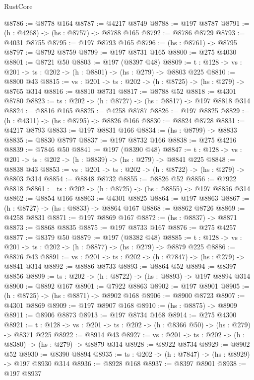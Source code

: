 \begin{lexlean}{RustCore}
\begin{coremodule}
@8786 := @8778 @164
@8787 := @4217 @8749
@8788 := @197 @8787
@8791 := (h : @4268) -> (hs : @8757) -> @8788 @165
@8792 := @8786 @8729
@8793 := @4031 @8755
@8795 := @197 @8793 @165
@8796 := (hs : @8761) -> @8795
@8797 := @8792 @8759
@8799 := @197 @8731 @165
@8800 := @275 @4030
@8801 := @8721 @50
@8803 := @197 (@8397 @48)
@8809 := {t : @128} -> {vs : @201} -> {ts : @202} -> (h : @8801) -> (hs : @279) -> @8803 @225
@8810 := @8800 @43
@8815 := {vs : @201} -> {ts : @202} -> (h : @8725) -> (hs : @279) -> @8765 @314
@8816 := @8810 @8731
@8817 := @8788 @52
@8818 := @4301 @8780
@8823 := {ts : @202} -> (h : @8727) -> (hs : @8817) -> @197 @8818 @314
@8824 := @8816 @165
@8825 := @4258 @8787
@8826 := @197 @8825
@8829 := (h : @4311) -> (hs : @8795) -> @8826 @166
@8830 := @8824 @8728
@8831 := @4217 @8793
@8833 := @197 @8831 @166
@8834 := (hs : @8799) -> @8833
@8835 := @8830 @8797
@8837 := @197 @8732 @166
@8838 := @275 @4216
@8839 := @7846 @50
@8841 := @197 (@8390 @48)
@8847 := {t : @128} -> {vs : @201} -> {ts : @202} -> (h : @8839) -> (hs : @279) -> @8841 @225
@8848 := @8838 @43
@8853 := {vs : @201} -> {ts : @202} -> (h : @8722) -> (hs : @279) -> @8803 @314
@8854 := @8848 @8732
@8855 := @8826 @52
@8856 := @7922 @8818
@8861 := {ts : @202} -> (h : @8725) -> (hs : @8855) -> @197 @8856 @314
@8862 := @8854 @166
@8863 := @4301 @8825
@8864 := @197 @8863
@8867 := (h : @8727) -> (hs : @8833) -> @8864 @167
@8868 := @8862 @8726
@8869 := @4258 @8831
@8871 := @197 @8869 @167
@8872 := (hs : @8837) -> @8871
@8873 := @8868 @8835
@8875 := @197 @8733 @167
@8876 := @275 @4257
@8877 := @8379 @50
@8879 := @197 (@8382 @48)
@8885 := {t : @128} -> {vs : @201} -> {ts : @202} -> (h : @8877) -> (hs : @279) -> @8879 @225
@8886 := @8876 @43
@8891 := {vs : @201} -> {ts : @202} -> (h : @7847) -> (hs : @279) -> @8841 @314
@8892 := @8886 @8733
@8893 := @8864 @52
@8894 := @8397 @8856
@8899 := {ts : @202} -> (h : @8722) -> (hs : @8893) -> @197 @8894 @314
@8900 := @8892 @167
@8901 := @7922 @8863
@8902 := @197 @8901
@8905 := (h : @8725) -> (hs : @8871) -> @8902 @168
@8906 := @8900 @8723
@8907 := @4301 @8869
@8909 := @197 @8907 @168
@8910 := (hs : @8875) -> @8909
@8911 := @8906 @8873
@8913 := @197 @8734 @168
@8914 := @275 @4300
@8921 := {t : @128} -> {vs : @201} -> {ts : @202} -> (h : @8366 @50) -> (hs : @279) -> @8371 @225
@8922 := @8914 @43
@8927 := {vs : @201} -> {ts : @202} -> (h : @8380) -> (hs : @279) -> @8879 @314
@8928 := @8922 @8734
@8929 := @8902 @52
@8930 := @8390 @8894
@8935 := {ts : @202} -> (h : @7847) -> (hs : @8929) -> @197 @8930 @314
@8936 := @8928 @168
@8937 := @8397 @8901
@8938 := @197 @8937

\end{coremodule}
\end{lexlean}
